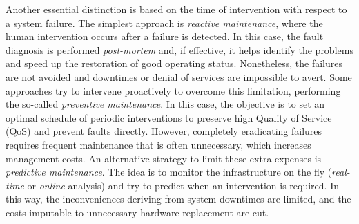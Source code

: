 Another essential distinction is based on the time of intervention with respect to a system failure. 
The simplest approach is \textit{reactive maintenance}, where the human intervention occurs after a failure is detected. In this case, the fault diagnosis is performed \textit{post-mortem} and, if effective, it helps identify the problems and speed up the restoration of good operating status. 
Nonetheless, the failures are not avoided and downtimes or denial of services are impossible to avert.
Some approaches try to intervene proactively to overcome this limitation, performing the so-called \textit{preventive maintenance}. In this case, the objective is to set an optimal schedule of periodic interventions to preserve high Quality of Service (QoS) and prevent faults directly.
However, completely eradicating failures requires frequent maintenance that is often unnecessary, which increases management costs.
An alternative strategy to limit these extra expenses is \textit{predictive maintenance}. The idea is to monitor the infrastructure on the fly (\textit{real-time} or \textit{online} analysis) and try to predict when an intervention is required. In this way, the inconveniences deriving from system downtimes are limited, and the costs imputable to unnecessary hardware replacement are cut.

